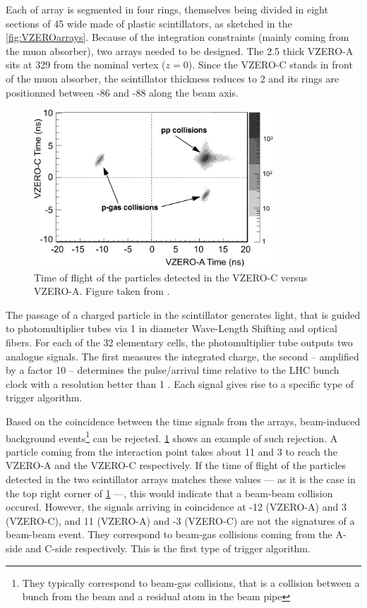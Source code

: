 Each of array is segmented in four rings, themselves being divided in eight sections of 45 wide made of plastic scintillators, as sketched in the \fig\ref{fig:VZEROarrays}. Because of the integration constraints (mainly coming from the muon absorber), two arrays needed to be designed. The 2.5 \cm thick VZERO-A sits at 329 \cm from the nominal vertex ($z = 0$). Since the VZERO-C stands in front of the muon absorber, the scintillator thickness reduces to 2 \cm and its rings are positionned between -86 and -88 \cm along the beam axis. 

\begin{figure}[h]
	\centering
	\includegraphics[width=0.8\textwidth]{Figs/Chapter3/Fig6_2-4228.png}
	\caption{Time of flight of the particles detected in the VZERO-C versus VZERO-A. Figure taken from \cite{alicecollaborationPerformanceALICEVZERO2013}.}
	\label{fig:VZERObeamgas}
\end{figure}

The passage of a charged particle in the scintillator generates light, that is guided to photomultiplier tubes via 1 \mm in diameter Wave-Length Shifting and optical fibers. For each of the 32 elementary cells, the photomultiplier tube outputs two analogue signals. The first measures the integrated charge, the second -- amplified by a factor 10 -- determines the pulse/arrival time relative to the LHC bunch clock with a resolution better than 1 \nsec. Each signal gives rise to a specific type of trigger algorithm. 

Based on the coincidence between the time signals from the arrays, beam-induced background events\footnote{They typically correspond to beam-gas collisions, that is a collision between a bunch from the beam and a residual atom in the beam pipe} can be rejected. \Fig\ref{fig:VZERObeamgas} shows an example of such rejection. A particle coming from the interaction point takes about 11 \nsec and 3 \nsec to reach the VZERO-A and the VZERO-C respectively. If the time of flight of the particles detected in the two scintillator arrays matches these values --- as it is the case in the top right corner of \fig\ref{fig:VZERObeamgas} ---, this would indicate that a beam-beam collision occured. However, the signals arriving in coincidence at -12 \nsec (VZERO-A) and 3 \nsec (VZERO-C), and 11 \nsec (VZERO-A) and -3 \nsec (VZERO-C) are not the signatures of a beam-beam event. They correspond to beam-gas collisions coming from the A-side and C-side respectively. This is the first type of trigger algorithm.

